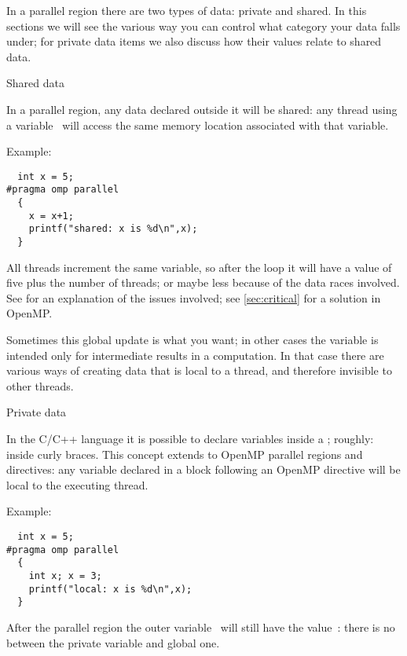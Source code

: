 
\label{sec:ompdata}

In a parallel region there are two types of data: private and shared.
In this sections we will see the various way you can control what category
your data falls under; for private data items we also discuss how their values
relate to shared data.

 {Shared data}

In a parallel region, any data declared outside it will be shared:
any thread using a variable~ will access the same memory location
associated with that variable.

Example:
\begin{lstlisting}
  int x = 5;
#pragma omp parallel
  {
    x = x+1;
    printf("shared: x is %d\n",x);
  }
\end{lstlisting}
All threads increment the same variable, so after the loop it will
have a value of five plus the number of threads; or maybe less because of the data races
involved. See  for an explanation of the issues involved;
see \ref{sec:critical} for a solution in OpenMP.

Sometimes this global update is what you want; in other cases the
variable is intended only for intermediate results in a computation.
In that case 
there are various ways of creating
data that is local to a thread, and therefore invisible to other threads.

 {Private data}
\label{sec:omp-private}

In the C/C++ language it is possible to declare variables inside
a ; roughly: inside curly braces.
This concept extends to OpenMP parallel regions and directives:
any variable declared in a block following an OpenMP directive
will be local to the executing thread.

Example:
\begin{lstlisting}
  int x = 5;
#pragma omp parallel
  {
    int x; x = 3;
    printf("local: x is %d\n",x);
  }
\end{lstlisting}
After the parallel region the outer variable~ will still have the
value~: there is no  between the
private variable and global one.

